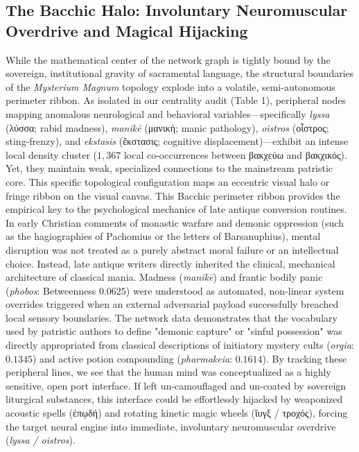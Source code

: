 \documentclass[11pt,twoside,a4paper]{article}
\begin{document}
\subsection{The Bacchic Halo: Involuntary Neuromuscular Overdrive and Magical Hijacking}
While the mathematical center of the network graph is tightly bound by the sovereign, institutional gravity of sacramental language, the structural boundaries of the \textit{Mysterium Magnum} topology explode into a volatile, semi-autonomous perimeter ribbon. As isolated in our centrality audit (Table 1), peripheral nodes mapping anomalous neurological and behavioral variables—specifically \textit{lyssa} (\textgreek{λύσσα}; rabid madness), \textit{manikē} (\textgreek{μανική}; manic pathology), \textit{oistros} (\textgreek{οἶστρος}; sting-frenzy), and \textit{ekstasis} (\textgreek{ἔκστασις}; cognitive displacement)—exhibit an intense local density cluster ($1,367$ local co-occurrences between \textgreek{βακχεύω} and \textgreek{βακχικός}). Yet, they maintain weak, specialized connections to the mainstream patristic core. This specific topological configuration maps an eccentric visual halo or fringe ribbon on the visual canvas.
This Bacchic perimeter ribbon provides the empirical key to the psychological mechanics of late antique conversion routines. In early Christian comments of monastic warfare and demonic oppression (such as the hagiographies of Pachomius or the letters of Barsanuphius), mental disruption was not treated as a purely abstract moral failure or an intellectual choice. Instead, late antique writers directly inherited the clinical, mechanical architecture of classical mania. Madness (\textit{manikē}) and frantic bodily panic (\textit{phobos}: Betweenness $0.0625$) were understood as automated, non-linear system overrides triggered when an external adversarial payload successfully breached local sensory boundaries.
The network data demonstrates that the vocabulary used by patristic authors to define "demonic capture" or "sinful possession" was directly appropriated from classical descriptions of initiatory mystery cults (\textit{orgia}: $0.1345$) and active potion compounding (\textit{pharmakeia}: $0.1614$). By tracking these peripheral lines, we see that the human mind was conceptualized as a highly sensitive, open port interface. If left un-camouflaged and un-coated by sovereign liturgical substances, this interface could be effortlessly hijacked by weaponized acoustic spells (\textgreek{ἐπῳδή}) and rotating kinetic magic wheels (\textgreek{ἴυγξ / τροχός}), forcing the target neural engine into immediate, involuntary neuromuscular overdrive (\textit{lyssa / oistros}).
\end{document}

